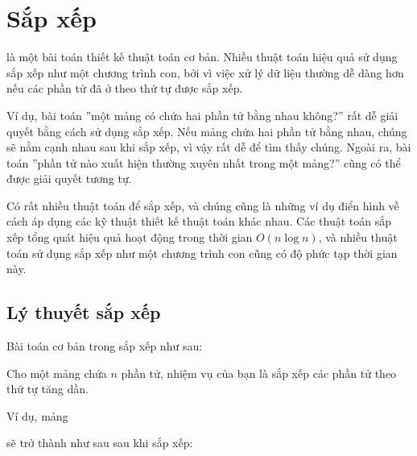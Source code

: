 \chapter{Sắp xếp}


là một bài toán thiết kế thuật toán cơ bản.
Nhiều thuật toán hiệu quả
sử dụng sắp xếp như một chương trình con,
bởi vì việc xử lý dữ liệu thường dễ dàng hơn
nếu các phần tử đã ở theo thứ tự được sắp xếp.

Ví dụ, bài toán ''một mảng có chứa
hai phần tử bằng nhau không?'' rất dễ giải quyết bằng cách sử dụng sắp xếp.
Nếu mảng chứa hai phần tử bằng nhau,
chúng sẽ nằm cạnh nhau sau khi sắp xếp,
vì vậy rất dễ để tìm thấy chúng.
Ngoài ra, bài toán ''phần tử nào xuất hiện thường xuyên nhất
trong một mảng?'' cũng có thể được giải quyết tương tự.

Có rất nhiều thuật toán để sắp xếp, và chúng cũng
là những ví dụ điển hình về cách áp dụng
các kỹ thuật thiết kế thuật toán khác nhau.
Các thuật toán sắp xếp tổng quát hiệu quả
hoạt động trong thời gian $O(n \log n)$,
và nhiều thuật toán sử dụng sắp xếp
như một chương trình con cũng
có độ phức tạp thời gian này.

\section{Lý thuyết sắp xếp}

Bài toán cơ bản trong sắp xếp như sau:
\begin{framed}
\noindent
Cho một mảng chứa $n$ phần tử,
nhiệm vụ của bạn là sắp xếp các phần tử
theo thứ tự tăng dần.
\end{framed}
\noindent
Ví dụ, mảng
\begin{center}
\end{center}
sẽ trở thành như sau sau khi sắp xếp:
\begin{center}
\end{center}

